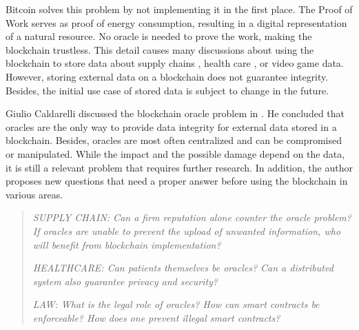 Bitcoin solves this problem by not implementing it in the first place.
The Proof of Work serves as proof of energy consumption, resulting in a digital representation of a natural resource.
No oracle is needed to prove the work, making the blockchain trustless. 
This detail causes many discussions about using the blockchain to store data about supply chains \cite{blockchain_supply_chains}, health care \cite{blockchain_healthcare}, or video game data.
However, storing external data on a blockchain does not guarantee integrity.
Besides, the initial use case of stored data is subject to change in the future.

Giulio Caldarelli discussed the blockchain oracle problem in \cite{info11110509}.
He concluded that oracles are the only way to provide data integrity for external data stored in a blockchain.
Besides, oracles are most often centralized and can be compromised or manipulated.
While the impact and the possible damage depend on the data, it is still a relevant problem that requires further research.
In addition, the author proposes new questions that need a proper answer before using the blockchain in various areas.

\begin{quote}
	\textit{
		SUPPLY CHAIN: Can a firm reputation alone counter the oracle problem? If oracles are unable to prevent the upload of unwanted information, who will benefit from blockchain implementation?
		}
		
	\textit{
		HEALTHCARE: Can patients themselves be oracles? Can a distributed system also guarantee privacy and security?
		}
		
   \textit{
   		LAW: What is the legal role of oracles? How can smart contracts be enforceable? How does one prevent illegal smart contracts? 
   }
   \cite{info11110509}
\end{quote}

